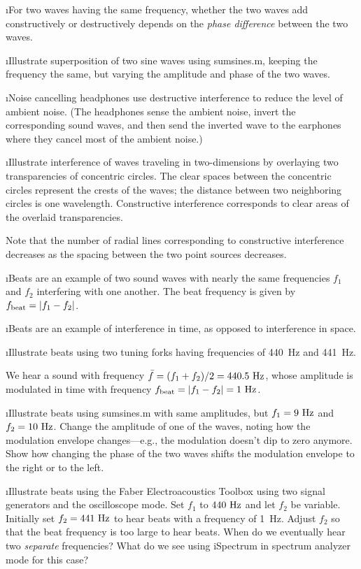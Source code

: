 \i For two waves having the same frequency, whether the two
waves add constructively or destructively depends on the
{\em phase difference} between the two waves.

\i \demo Illustrate superposition of two sine waves using sumsines.m,
keeping the frequency the same, but varying the amplitude and 
phase of the two waves.

\i \ex Noise cancelling headphones use destructive interference 
to reduce the level of ambient noise.
(The headphones sense the ambient noise, invert the corresponding
sound waves, and then send the inverted wave to the earphones where 
they cancel most of the ambient noise.)

\i \demo Illustrate interference of waves traveling in two-dimensions
by overlaying two transparencies of concentric circles.
The clear spaces between the concentric circles represent the crests 
of the waves; the distance between two neighboring 
circles is one wavelength.
Constructive interference corresponds to clear areas of the overlaid 
transparencies.

Note that the number of radial lines corresponding to 
constructive interference decreases as the spacing between the two 
point sources decreases.

\i Beats are an example of two sound waves with nearly
the same frequencies $f_1$ and $f_2$ interfering with
one another.
The beat frequency is given by $f_{\rm beat} = |f_1-f_2|$.

\i Beats are an example of interference in time, as opposed to 
interference in space.

\i \demo Illustrate beats using two tuning forks having
frequencies of 440~Hz and 441~Hz.

We hear a sound with frequency 
$\bar f =(f_1+f_2)/2= 440.5~{\rm Hz}$, whose amplitude is 
modulated in time with frequency $f_{\rm beat}=|f_1-f_2|=1~{\rm Hz}$.

\i \demo Illustrate beats using sumsines.m
with same amplitudes, but $f_1=9~{\rm Hz}$ and $f_2=10~{\rm Hz}$.
Change the amplitude of one of the waves, noting how the 
modulation envelope changes---e.g., the modulation doesn't dip to
zero anymore.
Show how changing the phase of the two waves shifts the modulation
envelope to the right or to the left.

\i \demo Illustrate beats using the Faber Electroacoustics Toolbox
using two signal generators and the oscilloscope mode.
Set $f_1$ to $440~{\rm Hz}$ and let $f_2$ be variable.
Initially set $f_2=441~{\rm Hz}$ to hear beats with a frequency
of 1~Hz.
Adjust $f_2$ so that the beat frequency is too large to hear beats.
When do we eventually hear two {\em separate} frequencies?
What do we see using iSpectrum in spectrum analyzer mode for this case?

